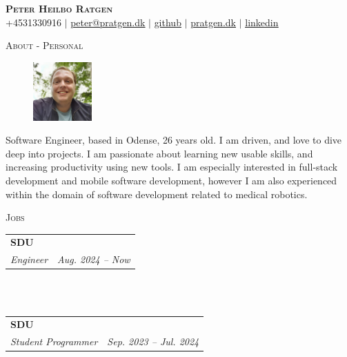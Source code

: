\documentclass[11pt]{article}
\makeatletter
\newcommand{\resumeSubheading}[4]{
  \noindent\begin{tabular*}{0.98\textwidth}[t]{l@{\extracolsep{\fill}}r}
    \noindent \textbf{#1} & #2 \\ \vspace{-3pt} 
    \noindent \textit{\small#3} & \textit{\small #4} 
  \end{tabular*}\vspace{7pt}
}
\makeatother
\begin{document}
\begin{center}
  \textbf{\huge{\scshape{Peter Heilbo Ratgen}}}\\ 
  \vspace{0.2cm}
  \small +4531330916 $|$
  \href{mailto:peter@pratgen.dk}{\underline{peter@pratgen.dk}} $|$
  \href{https://github.com/ratgen }{\underline{github}} $|$
  \href{https://pratgen.dk}{\underline{pratgen.dk}} $|$
  \href{https://www.linkedin.com/in/peter-ratgen-a1236529/}{\underline{linkedin}}
\end{center}

\noindent\large{\scshape{About - Personal}} \newline
\noindent{\rule[0.3cm]{\textwidth}{0.4pt}}

\begin{figure}
  \vspace{-0.7cm}
  \includegraphics[width=0.2\textwidth, right]{./profile.jpg}
\end{figure}
\normalsize Software Engineer, based in Odense, 26 years
old. I am driven, and love to dive deep into projects. I am passionate about
learning new usable skills, and increasing productivity using new tools. I am
especially interested in full-stack development and mobile software development,
however I am also experienced within the  domain of software development related
to medical robotics. 

\vspace{0.3cm}

\noindent\large{\scshape{Jobs}} \newline
\noindent{\rule[0.3cm]{\textwidth}{0.4pt}}

\resumeSubheading{SDU}{}{Engineer}{Aug. 2024 -- Now}\\
 \\

\resumeSubheading{SDU}{}{Student Programmer}{Sep. 2023 -- Jul. 2024}\\
 \\
\end{document}

